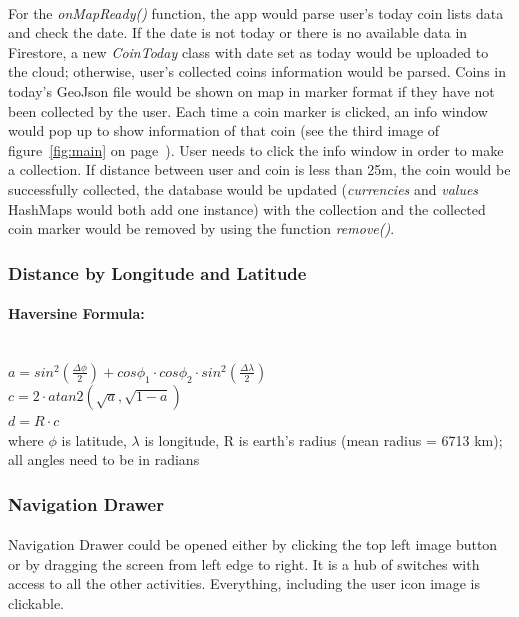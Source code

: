 \documentclass[12pt]{article}
\begin{document}
\paragraph{}
For the \textit{onMapReady()} function, the app would parse user's today coin lists data and check the date. If the date is not today or there is no available data in Firestore, a new \textit{CoinToday} class with date set as today would be uploaded to the cloud; otherwise, user's collected coins information would be parsed. Coins in today's GeoJson file would be shown on map in marker format if they have not been collected by the user. Each time a coin marker is clicked, an info window would pop up to show information of that coin (see the third image of figure~\ref{fig:main} on page~\pageref{fig:main}). User needs to click the info window in order to make a collection. If distance between user and coin is less than 25m, the coin would be successfully collected, the database would be updated (\textit{currencies} and \textit{values} HashMaps would both add one instance) with the collection and the collected coin marker would be removed by using the function \textit{remove()}.
\subsubsection{Distance by Longitude and Latitude}
\paragraph{Haversine Formula:}\mbox{}\\
\null\hspace{12pt} $a = sin^2(\frac{\Delta \phi}{2}) + cos\phi_1 \cdot cos\phi_2 \cdot sin^2(\frac{\Delta \lambda}{2})$ \\
\null\hspace{12pt} $c = 2 \cdot atan2(\sqrt{a}, \sqrt{1 - a})$ \\
\null\hspace{12pt} $d = R \cdot c$ \\
\null\hspace{12pt} where $\phi$ is latitude, $\lambda$ is longitude, R is earth's radius (mean radius = 6713 km); all angles need to be in radians
\subsubsection{Navigation Drawer}
\paragraph{}
Navigation Drawer could be opened either by clicking the top left image button or by dragging the screen from left edge to right. It is a hub of switches with access to all the other activities. Everything, including the user icon image is clickable.
\end{document}
